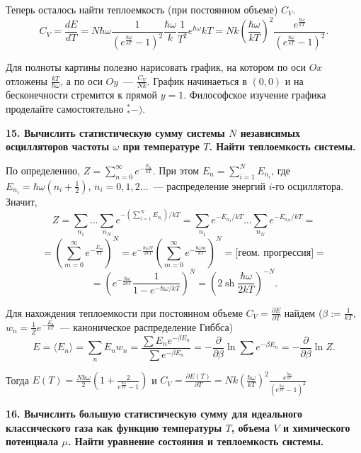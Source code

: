 \documentclass[a4paper,12pt]{article}
\begin{document}
Теперь осталось найти теплоемкость (при постоянном объеме) $C_V$.
%
$$C_V=\frac{dE}{dT}=N\hbar\omega\frac1
    {\left(e^{\frac{\hbar\omega}{kT}}-1\right)^2}
    \frac{\hbar\omega}k\frac1{T^2}e^{\hbar\omega}{kT}=
  Nk\left(\frac{\hbar\omega}{kT}\right)^2\frac
    {e^{\frac{\hbar\omega}{kT}}}
    {\left(e^{\frac{\hbar\omega}{kT}}-1\right)^2}.$$

Для полноты картины полезно нарисовать график, на котором по оси $Ox$
отложены $\frac{kT}{\hbar\omega}$, а по оси $Oy$~--- $\frac{C_V}{Nk}$.
График начинаеться в $(0,0)$ и на бесконечности стремится к прямой $y=1$.
Философское изучение графика проделайте самостоятельно ${}^*_*-)$.

\noindent\textbf{15. Вычислить статистическую сумму системы $N$
независимых осцилляторов частоты $\omega $ при температуре $T$.
Найти теплоемкость системы.}

По определению, $\displaystyle Z=\sum\limits_{n=0}^\infty e^{-\frac{E_n}{kT}}$.
При этом $E_n=\sum\limits_{i=1}^N E_{n_i}$, где $E_{n_i}=\hbar\omega(n_i+\frac12)$,
$n_i=0,1,2\ldots$~--- распределение энергий $i$-го осциллятора. Значит,
%
   $$Z=\sum_{n_1}\ldots\sum_{n_N}e^{-(\sum_{i=1}^N E_{n_i})/kT}=
       \sum_{n_1}e^{-E_{n_1}/kT}\ldots\sum_{n_N}e^{-E_{n_N}/kT}=$$
   $$=\left(\sum\limits_{m=0}^\infty e^{-\frac{E_m}{kT}}\right)^N=
       e^{-\frac{\hbar\omega N}{2kT}}\left(\sum_{m=0}^\infty
            e^{-\frac{\hbar\omega m}{kT}}\right)^N=\mbox{[геом. прогрессия]}=$$
   $$=\left(e^{-\frac{\hbar\omega}{2kT}}\frac1{1-e^{-\hbar\omega/kT}}\right)^N=
       \left(2\mathop{sh}\frac{\hbar\omega}{2kT}\right)^{-N}.$$

Для нахождения теплоемкости при постоянном объеме
   $C_V=\frac{\partial E}{\partial T}$
найдем ($\beta:=\frac1{kT}$, $w_n=\frac1Ze^{-\frac{E_n}{kT}}$~--- каноническое
распределение Гиббса)
%
   $$E=\langle E_n\rangle=\sum\limits_n E_nw_n=
          \frac{\sum E_ne^{-\beta E_n}}{\sum e^{-\beta E_n}}=
          -\frac\partial{\partial\beta}\ln\sum e^{-\beta E_n}=
          -\frac\partial{\partial\beta}\ln Z.$$

Тогда
$\displaystyle E(T)=
  \frac{N\hbar\omega}2\left(1+\frac2{e^{\frac{\hbar\omega}{kT}}-1}\right)$
и
$\displaystyle C_V=\frac{\partial E(T)}{\partial T}=
   Nk\left(\frac{\hbar\omega}{kT}\right)^2
   \frac
        {e^{\frac{\hbar\omega}{kT}}}
        {\left(e^{\frac{\hbar\omega}{kT}}-1\right)^2}$

\noindent \textbf{16. Вычислить большую статистическую сумму для
идеального классического газа как функцию температуры $T$, объема
$V$ и химического потенциала $\mu $. Найти уравнение состояния и
теплоемкость системы.}
\end{document}
